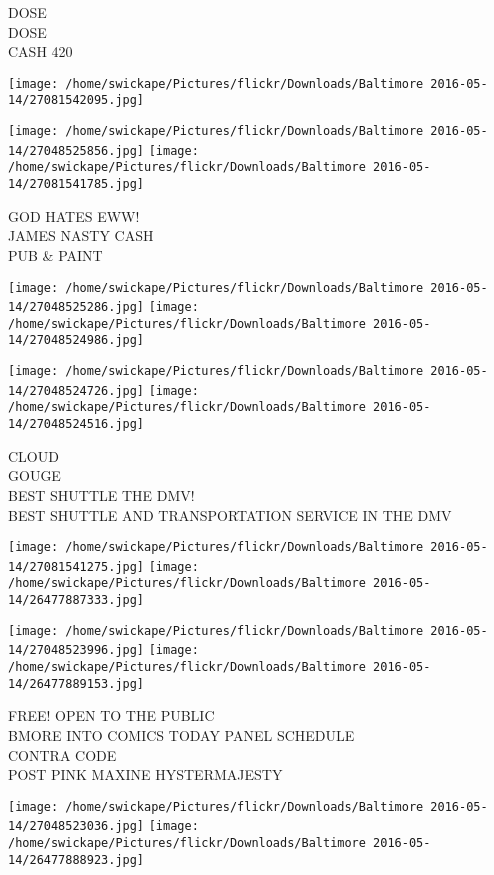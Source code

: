 \documentclass[10pt,letterpaper]{article}
\begin{document}
DOSE\\
DOSE\\
CASH 420
\pagebreak

\texttt{[image: /home/swickape/Pictures/flickr/Downloads/Baltimore 2016-05-14/27081542095.jpg]}

\vspace{0.25in}
\texttt{[image: /home/swickape/Pictures/flickr/Downloads/Baltimore 2016-05-14/27048525856.jpg]}
\texttt{[image: /home/swickape/Pictures/flickr/Downloads/Baltimore 2016-05-14/27081541785.jpg]}

GOD HATES EWW!\\
JAMES NASTY CASH\\
PUB \& PAINT
\pagebreak

\texttt{[image: /home/swickape/Pictures/flickr/Downloads/Baltimore 2016-05-14/27048525286.jpg]}
\texttt{[image: /home/swickape/Pictures/flickr/Downloads/Baltimore 2016-05-14/27048524986.jpg]}

\texttt{[image: /home/swickape/Pictures/flickr/Downloads/Baltimore 2016-05-14/27048524726.jpg]}
\texttt{[image: /home/swickape/Pictures/flickr/Downloads/Baltimore 2016-05-14/27048524516.jpg]}

CLOUD\\
GOUGE\\
BEST SHUTTLE THE DMV!\\
BEST SHUTTLE AND TRANSPORTATION SERVICE IN THE DMV
\pagebreak

\texttt{[image: /home/swickape/Pictures/flickr/Downloads/Baltimore 2016-05-14/27081541275.jpg]}
\texttt{[image: /home/swickape/Pictures/flickr/Downloads/Baltimore 2016-05-14/26477887333.jpg]}

\texttt{[image: /home/swickape/Pictures/flickr/Downloads/Baltimore 2016-05-14/27048523996.jpg]}
\texttt{[image: /home/swickape/Pictures/flickr/Downloads/Baltimore 2016-05-14/26477889153.jpg]}

FREE!  OPEN TO THE PUBLIC\\
BMORE INTO COMICS TODAY PANEL SCHEDULE\\
CONTRA CODE\\
POST PINK MAXINE HYSTERMAJESTY
\pagebreak

\texttt{[image: /home/swickape/Pictures/flickr/Downloads/Baltimore 2016-05-14/27048523036.jpg]}
\texttt{[image: /home/swickape/Pictures/flickr/Downloads/Baltimore 2016-05-14/26477888923.jpg]}
\end{document}
